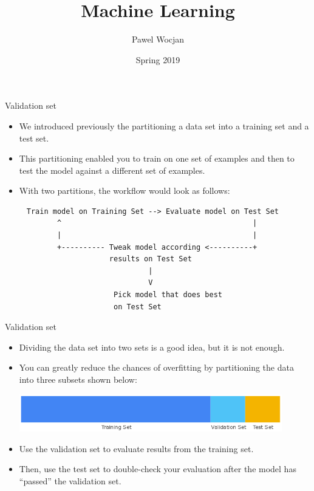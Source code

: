 \documentclass{beamer}
\title[ML]{Machine Learning}
\author{Pawel Wocjan}
\institute{University of Central Florida}
\date{Spring 2019}
\begin{document}
\begin{frame}
  \titlepage
\end{frame}

\begin{frame}[fragile]{Validation set}

\begin{itemize}
\item We introduced previously the partitioning a data set into a training set and a test set. 

\medskip
\item This partitioning enabled you to train on one set of examples and then to test the model against a different set of examples. 

\medskip
\item With two partitions, the workflow would look as follows:
\end{itemize}

{\footnotesize
\begin{verbatim}
     Train model on Training Set --> Evaluate model on Test Set
            ^                                            |
            |                                            |
            +---------- Tweak model according <----------+
                        results on Test Set
                                 |
                                 V
                         Pick model that does best
                         on Test Set
\end{verbatim}
}
\end{frame}


\begin{frame}{Validation set}
\begin{itemize}
\item Dividing the data set into two sets is a good idea, but it is not enough. 

\medskip
\item You can greatly reduce the chances of overfitting by partitioning the data into three subsets shown below:

\medskip
\includegraphics[width=0.9\textwidth]{images/PartitionThreeSets.png}

\medskip
\item Use the validation set to evaluate results from the training set. 

\medskip
\item Then, use the test set to double-check your evaluation after the model has ``passed'' the validation set.
\end{itemize}
\end{frame}
\end{document}

